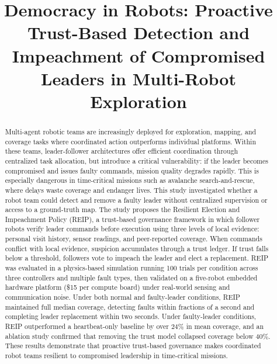 \documentclass[conference]{IEEEtran}
\begin{document}
\title{Democracy in Robots: Proactive Trust-Based Detection and Impeachment of Compromised Leaders in Multi-Robot Exploration}

\author{
}

\maketitle

\begin{abstract}
Multi-agent robotic teams are increasingly deployed for exploration, mapping, and coverage tasks where coordinated action outperforms individual platforms. Within these teams, leader-follower architectures offer efficient coordination through centralized task allocation, but introduce a critical vulnerability: if the leader becomes compromised and issues faulty commands, mission quality degrades rapidly. This is especially dangerous in time-critical missions such as avalanche search-and-rescue, where delays waste coverage and endanger lives. This study investigated whether a robot team could detect and remove a faulty leader without centralized supervision or access to a ground-truth map.
The study proposes the Resilient Election and Impeachment Policy (REIP), a trust-based governance framework in which follower robots verify leader commands before execution using three levels of local evidence: personal visit history, sensor readings, and peer-reported coverage. When commands conflict with local evidence, suspicion accumulates through a trust ledger. If trust falls below a threshold, followers vote to impeach the leader and elect a replacement. REIP was evaluated in a physics-based simulation running 100 trials per condition across three controllers and multiple fault types, then validated on a five-robot embedded hardware platform (\$15 per compute board) under real-world sensing and communication noise.
Under both normal and faulty-leader conditions, REIP maintained full median coverage, detecting faults within fractions of a second and completing leader replacement within two seconds. Under faulty-leader conditions, REIP outperformed a heartbeat-only baseline by over 24\% in mean coverage, and an ablation study confirmed that removing the trust model collapsed coverage below 40\%. These results demonstrate that proactive trust-based governance makes coordinated robot teams resilient to compromised leadership in time-critical missions.

\end{abstract}
\end{document}
